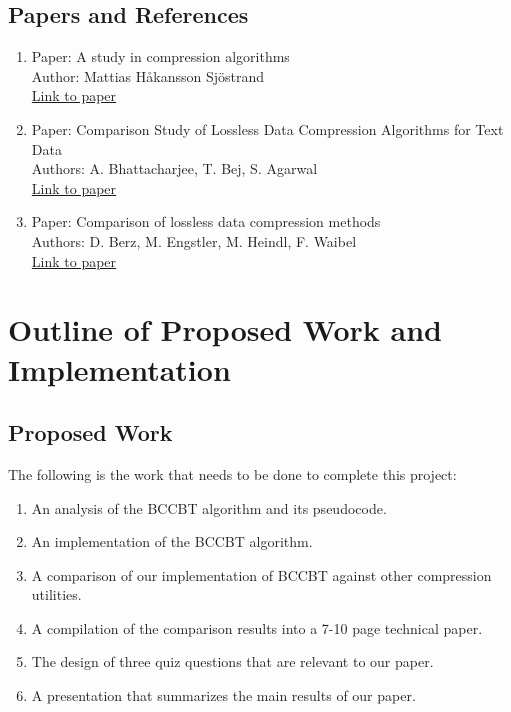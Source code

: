 \documentclass[11pt]{article}
\begin{document}
\subsection*{Papers and References}
\begin{enumerate}[(1)]
\item Paper: A study in compression algorithms \\
        Author: Mattias Håkansson Sjöstrand\\ 
        \href{http://bth.diva-portal.org/smash/record.jsf?faces-redirect=true&aq2=\%5B\%5B\%5D\%5D\&af=\%5B\%5D\&searchType=SIMPLE\&language=en\&pid=diva2\%3A830266\&aq=\%5B\%5B\%5D\%5D\&sf=all\&aqe=\%5B\%5D\&sortOrder=author\_sort\_asc\&onlyFullText=false\&noOfRows=50\&dswid=482}{Link to paper}
  
  \item Paper: Comparison Study of Lossless Data Compression Algorithms for Text Data \\
        Authors: A. Bhattacharjee, T. Bej, S. Agarwal\\ 
        \href{https://www.semanticscholar.org/paper/Comparison-Study-of-Lossless-Data-Compression-for-Bhattacharjee-Bej/ac777e46e7473c9e20ae94cceb58dcd4c058ce01}{Link to paper}
  
  \item Paper: Comparison of lossless data compression methods \\
        Authors: D. Berz, M. Engstler, M. Heindl, F. Waibel\\
        \href{https://www.researchgate.net/publication/335572104_Comparison_of_lossless_data_compression_methods}{Link to paper}
\end{enumerate}

\newpage
\section*{Outline of Proposed Work and Implementation}

\subsection*{Proposed Work}
The following is the work that needs to be done to complete this project:
      \begin{enumerate}[1.]
            \item An analysis of the BCCBT algorithm and its pseudocode.
            \item An implementation of the BCCBT algorithm. 
            \item A comparison of our implementation of BCCBT against other compression utilities.
            \item A compilation of the comparison results into a 7-10 page technical paper.
            \item The design of three quiz questions that are relevant to our paper.
            \item A presentation that summarizes the main results of our paper.
      \end{enumerate}
\end{document}

